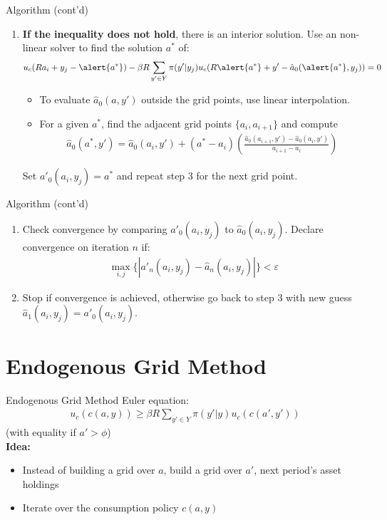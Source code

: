 \documentclass{beamer}
\begin{document}
\begin{frame}{Algorithm (cont'd)}
\begin{enumerate}
\resume
\item \textbf{If the inequality does not hold}, there is an interior solution. Use an non-linear solver to find the solution $a^*$ of:
\begin{align*}
u_c(Ra_i + y_j - \alert{a^*}) - \beta R \displaystyle \sum_{y' \in Y} \pi(y'|y_j) u_c(R\alert{a^*} + y' - \hat{a}_0(\alert{a^*}, y_j)) = 0
\end{align*} 
\begin{itemize}
\item To evaluate $\hat{a}_0(a, y')$ outside the grid points, use linear interpolation.
\item For a given $a^*$, find the adjacent grid points $\{a_i, a_{i+1}\}$ and compute
\begin{align*}
\hat{a}_0(a^*, y') = \hat{a}_0(a_i, y') + (a^* - a_i) \left( \frac{\hat{a}_0(a_{i+1}, y') - \hat{a}_0(a_i, y')}{a_{i+1} - {a_i}} \right)
\end{align*} 
\end{itemize}
Set $a'_0(a_i, y_j) = a^*$ and repeat step 3 for the next grid point.
\saveenum
\end{enumerate}
\end{frame}

\begin{frame}{Algorithm (cont'd)}
\begin{enumerate}
\resume
\item Check convergence by comparing $a'_0(a_i, y_j)$ to $\hat{a}_0(a_i, y_j)$. Declare convergence on iteration $n$ if:
\begin{align*}
\max_{i, j} \{|a'_n(a_i, y_j) - \hat{a}_n(a_i, y_j)| \} < \varepsilon
\end{align*}
\item Stop if convergence is achieved, otherwise go back to step 3 with new guess $\hat{a}_1(a_i, y_j) = a'_0(a_i, y_j)$.
\saveenum
\end{enumerate}
\end{frame}

\section{Endogenous Grid Method}

\begin{frame}{Endogenous Grid Method}
Euler equation:
\begin{align*}
u_c(c(a, y)) \geq \beta R \displaystyle \sum_{y' \in Y} \pi(y'|y) u_c(c(a', y'))
\end{align*}
(with equality if $a' > \phi$) \\ \vspace{5mm}
\textbf{Idea:}
\begin{itemize}
\item Instead of building a grid over $a$, build a grid over $a'$, next period's asset holdings
\item Iterate over the consumption policy $c(a, y)$
\end{itemize}
\end{frame}
\end{document}
